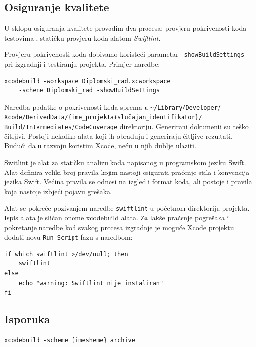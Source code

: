 \documentclass[times, utf8, diplomski, numeric]{fer}
\begin{document}
\begin{appendices}
\subsection{Osiguranje kvalitete} \label{OsiguranjeKvaliteteImplementacija}

U sklopu osiguranja kvalitete provodim dva procesa: provjeru pokrivenosti koda testovima i statičku provjeru koda alatom \textit{Swiftlint}.

Provjeru pokrivenosti koda dobivamo koristeći parametar \verb|-showBuildSettings| pri izgradnji i testiranju projekta. Primjer naredbe:

\begin{verbatim}
xcodebuild -workspace Diplomski_rad.xcworkspace
    -scheme Diplomski_rad -showBuildSettings
\end{verbatim}

Naredba podatke o pokrivenosti koda sprema u \verb|~/Library/Developer/|\\\verb|Xcode/DerivedData/{ime_projekta+slučajan_identifikator}/|\\\verb|Build/Intermediates/CodeCoverage| direktoriju. Generirani dokumenti su teško čitljivi. Postoji nekoliko alata koji ih obrađuju i generiraju čitljive rezultati. Budući da u razvoju koristim Xcode, neću u njih dublje ulaziti.

Switlint je alat za statičku analizu koda napisanog u programskom jeziku Swift. Alat definira veliki broj pravila kojim nastoji osigurati praćenje stila i konvencija jezika Swift. Većina pravila se odnosi na izgled i format koda, ali postoje i pravila koja nastoje izbjeći pojavu grešaka.

Alat se pokreće pozivanjem naredbe \verb|swiftlint| u početnom direktoriju projekta. Ispis alata je sličan onome xcodebuild alata. Za lakše praćenje pogrešaka i pokretanje naredbe kod svakog procesa izgradnje je moguće Xcode projektu dodati novu \verb|Run Script| fazu s naredbom:

\begin{verbatim}
if which swiftlint >/dev/null; then
    swiftlint
else
    echo "warning: Swiftlint nije instaliran"
fi
\end{verbatim}

\subsection{Isporuka}

\begin{verbatim}
xcodebuild -scheme {imesheme} archive
\end{verbatim}


\end{appendices}
\end{document}

